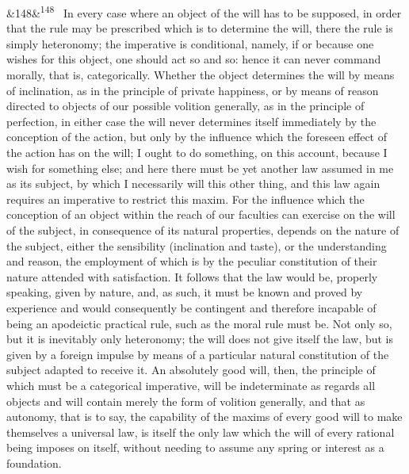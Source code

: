 \documentclass[12pt]{article}
\newcommand{\para}[1][]{\par\noindent\ifx&#1&\else\textsuperscript{\footnotesize #1}~\fi}
\begin{document}
\para[148] In every case where an object of the will has to be supposed, in order that the rule may be prescribed which is to determine the will, there the rule is simply heteronomy; the imperative is conditional, namely, if or because one wishes for this object, one should act so and so: hence it can never command morally, that is, categorically. Whether the object determines the will by means of inclination, as in the principle of private happiness, or by means of reason directed to objects of our possible volition generally, as in the principle of perfection, in either case the will never determines itself immediately by the conception of the action, but only by the influence which the foreseen effect of the action has on the will; I ought to do something, on this account, because I wish for something else; and here there must be yet another law assumed in me as its subject, by which I necessarily will this other thing, and this law again requires an imperative to restrict this maxim. For the influence which the conception of an object within the reach of our faculties can exercise on the will of the subject, in consequence of its natural properties, depends on the nature of the subject, either the sensibility (inclination and taste), or the understanding and reason, the employment of which is by the peculiar constitution of their nature attended with satisfaction. It follows that the law would be, properly speaking, given by nature, and, as such, it must be known and proved by experience and would consequently be contingent and therefore incapable of being an apodeictic practical rule, such as the moral rule must be. Not only so, but it is inevitably only heteronomy; the will does not give itself the law, but is given by a foreign impulse by means of a particular natural constitution of the subject adapted to receive it. An absolutely good will, then, the principle of which must be a categorical imperative, will be indeterminate as regards all objects and will contain merely the form of volition generally, and that as autonomy, that is to say, the capability of the maxims of every good will to make themselves a universal law, is itself the only law which the will of every rational being imposes on itself, without needing to assume any spring or interest as a foundation.
\end{document}
